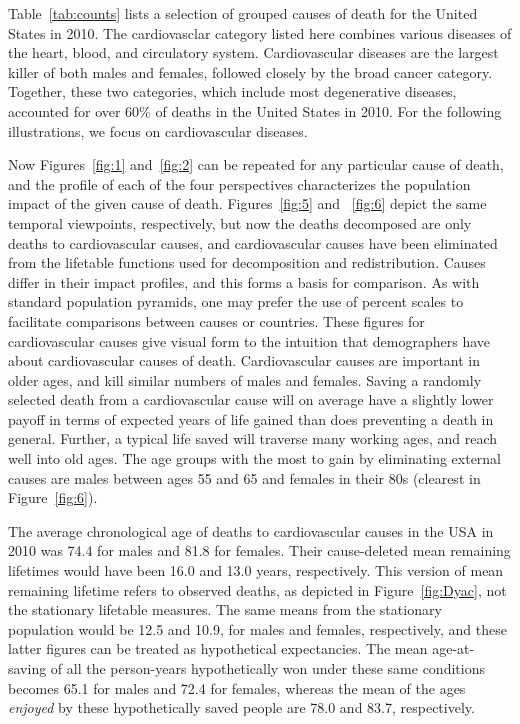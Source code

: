 \documentclass{article}
\begin{document}
Table~\ref{tab:counts} lists a selection of grouped causes of death for the
United States in 2010. The cardiovasclar category listed here combines
various diseases of the heart, blood, and circulatory system. Cardiovascular
diseases are the largest killer of both males and females, followed closely by
the broad cancer category. Together, these two categories, which include most
degenerative diseases, accounted for over 60\% of deaths in the United States in
2010. For the following illustrations, we focus on cardiovascular
diseases.

Now Figures~\ref{fig:1} and~\ref{fig:2}
can be repeated for any particular cause of death, and the profile of each of the four perspectives
characterizes the population impact of the given cause of death.
Figures~\ref{fig:5} and~ \ref{fig:6} depict the same temporal viewpoints,
respectively, but now the deaths decomposed are only deaths to cardiovascular
causes, and cardiovascular causes have been eliminated from the lifetable functions used for decomposition and
 redistribution. Causes differ in their impact profiles, and this forms a
 basis for comparison. As with standard population pyramids, one may prefer the
 use of percent scales to facilitate comparisons between causes or countries. These
 figures for cardiovascular causes give visual form to the intuition that demographers
 have about cardiovascular causes of death. Cardiovascular causes are important in
 older ages, and kill similar numbers of males and females. Saving a randomly
 selected death from a cardiovascular cause will on average have a slightly
 lower payoff in terms of expected years of life gained than does preventing a death in general. Further, a typical life saved will traverse many working ages, and reach well into old
 ages.
 The age groups with the most to gain by eliminating external causes are males
between ages 55 and 65 and females in their 80s (clearest in
Figure~\ref{fig:6}).
 
 The average chronological age of deaths to cardiovascular causes in the USA in
 2010 was 74.4 for males and 81.8 for females. Their cause-deleted mean
 remaining lifetimes would have been 16.0 and 13.0 years,
 respectively. This version of mean remaining lifetime refers to
 observed deaths, as depicted in Figure~\ref{fig:Dyac}, not the stationary
 lifetable measures. The same means from the stationary population would be 12.5
 and 10.9, for males and females, respectively, and these latter figures can
 be treated as hypothetical expectancies. The mean
 age-at-saving of all the person-years hypothetically won under these same conditions becomes 65.1 for males and 72.4 for females, whereas the mean of the ages \textit{enjoyed} by these hypothetically saved people are 78.0 and 83.7,
 respectively. 
 
\end{document}
